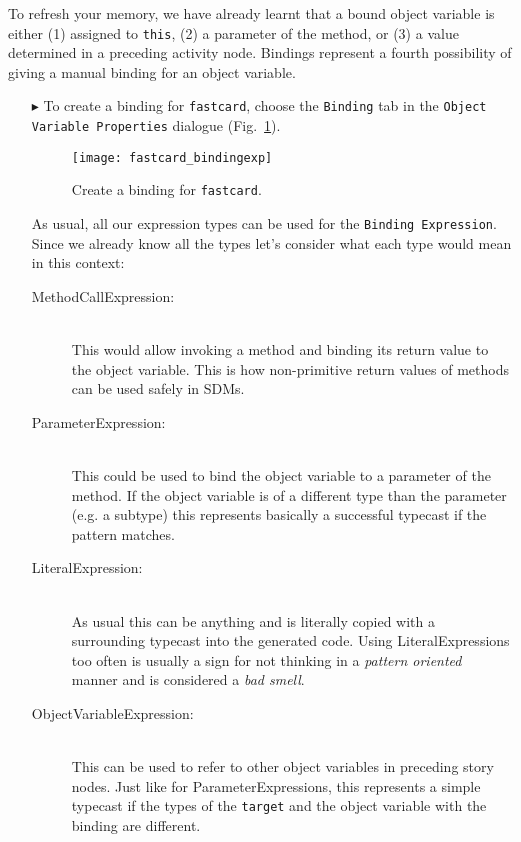 To refresh your memory, we have already learnt that a bound object variable is either (1) assigned to \texttt{this}, (2) a parameter of the method, or (3) a
value determined in a preceding activity node. Bindings represent a fourth possibility of giving a manual binding for an object variable.

\begin{itemize}
  
\item[$\blacktriangleright$] To create a binding for \texttt{fastcard}, choose the \texttt{Binding} tab in the \texttt{Object Variable Properties} dialogue (Fig.~\ref{fig:sdm_fastcard_3}).

\begin{figure}[htbp]
\begin{center}
  \texttt{[image: fastcard\_bindingexp]}
  \caption{Create a binding for \texttt{fastcard}.}  
  \label{fig:sdm_fastcard_3}
\end{center}
\end{figure}

As usual, all our expression types can be used for the \texttt{Binding Expression}.  
Since we already know all the types let's consider what each type would mean in this context: 
\begin{description}
  \item[MethodCallExpression:]~\\ This would allow invoking a method and binding
  its return value to the object variable.  This is how non-primitive return
  values of methods can be used safely in SDMs.
  
  \item[ParameterExpression:]~\\ This could be used to bind the object variable
  to a parameter of the method.  If the object variable is of a different type
  than the parameter (e.g. a subtype) this represents basically a successful
  typecast if the pattern matches.
  
  \item[LiteralExpression:]~\\ As usual this can be anything and is literally
  copied with a surrounding typecast into the generated code.  Using
  LiteralExpressions too often is usually a sign for not thinking in a
  \emph{pattern oriented} manner and is considered a \emph{bad smell}.
  
  \pagebreak
  
  \item[ObjectVariableExpression:]~\\ This can be used to refer to other object
  variables in preceding story nodes.  Just like for ParameterExpressions, this
  represents a simple typecast if the types of the \texttt{target} and the
  object variable with the binding are different.
\end{description}


\end{itemize}
